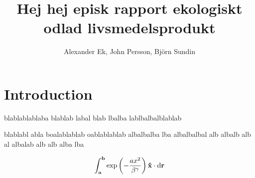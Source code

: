 \documentclass[12pt, titlepage, parskip=full*]{scrartcl}
\title{Hej hej episk rapport ekologiskt odlad livsmedelsprodukt}
\author{Alexander Ek, John Persson, Björn Sundin}
\begin{document}
\maketitle

\tableofcontents

\section{Introduction}

blablablablaba blablab labal blab lbalba lablbalbalblablab

blablabl abla boalablablab oablablablab albalbalba lba albalbalbal alb albalb alb al albalab alb alb alba lba

\begin{equation}
	\int_{\vb{a}}^{\vb{b}}\exp\left(-\frac{ax^2}{\beta^\gamma}\right)\vb{\hat{x}} \cdot \differential{\vb{r}}
\end{equation}
\end{document}
